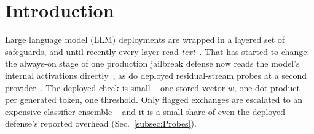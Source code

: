 \section{Introduction}
\label{sec:Introduction}

Large language model (LLM) deployments are wrapped in a layered set
of safeguards, and until recently every layer read
\emph{text}~\cite{metr2026policies}. That has started to change: the
always-on stage of one production jailbreak defense now reads the
model's internal activations
directly~\cite{ccpp2026,anthropic2026ccblog}, as do deployed
residual-stream probes at a second provider~\cite{gemini2026probes}.
The deployed check is small -- one stored vector $w$, one dot product
per generated token, one threshold. Only flagged exchanges are
escalated to an expensive classifier ensemble -- and it is a small
share of even the deployed defense's reported overhead
(Sec.~\ref{subsec:Probes}).

